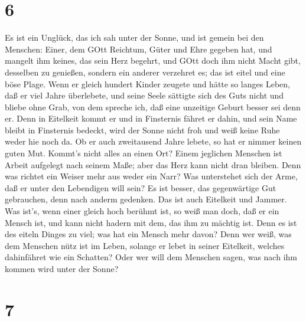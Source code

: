 \hypertarget{section-5}{%
\section{6}\label{section-5}}

 Es ist ein Unglück, das ich sah unter der Sonne, und ist
gemein bei den Menschen:  Einer, dem GOtt Reichtum, Güter
und Ehre gegeben hat, und mangelt ihm keines, das sein Herz begehrt, und
GOtt doch ihm nicht Macht gibt, desselben zu genießen, sondern ein
anderer verzehret es; das ist eitel und eine böse Plage. 
Wenn er gleich hundert Kinder zeugete und hätte so langes Leben, daß er
viel Jahre überlebete, und seine Seele sättigte sich des Guts nicht und
bliebe ohne Grab, von dem spreche ich, daß eine unzeitige Geburt besser
sei denn er.  Denn in Eitelkeit kommt er und in Finsternis
fähret er dahin, und sein Name bleibt in Finsternis bedeckt,
 wird der Sonne nicht froh und weiß keine Ruhe weder hie
noch da.  Ob er auch zweitausend Jahre lebete, so hat er
nimmer keinen guten Mut. Kommt's nicht alles an einen Ort? 
Einem jeglichen Menschen ist Arbeit aufgelegt nach seinem Maße; aber das
Herz kann nicht dran bleiben.  Denn was richtet ein Weiser
mehr aus weder ein Narr? Was unterstehet sich der Arme, daß er unter den
Lebendigen will sein?  Es ist besser, das gegenwärtige Gut
gebrauchen, denn nach anderm gedenken. Das ist auch Eitelkeit und
Jammer.  Was ist's, wenn einer gleich hoch berühmt ist, so
weiß man doch, daß er ein Mensch ist, und kann nicht hadern mit dem, das
ihm zu mächtig ist.  Denn es ist des eiteln Dinges zu viel;
was hat ein Mensch mehr davon?  Denn wer weiß, was dem
Menschen nütz ist im Leben, solange er lebet in seiner Eitelkeit,
welches dahinfähret wie ein Schatten? Oder wer will dem Menschen sagen,
was nach ihm kommen wird unter der Sonne?

\hypertarget{section-6}{%
\section{7}\label{section-6}}


